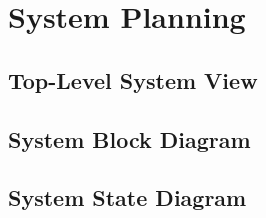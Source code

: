 \section{System Planning}
\subsection{Top-Level System View}
\subsection{System Block Diagram}
\subsection{System State Diagram}
